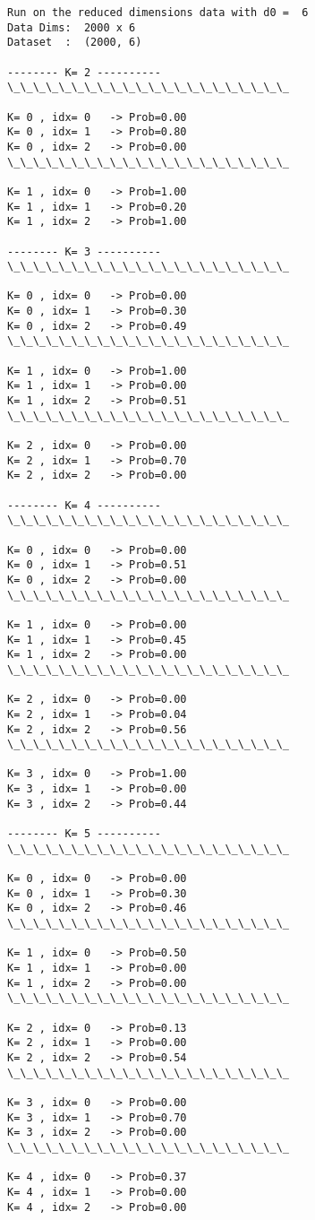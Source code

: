 \documentclass[11pt]{article}
\begin{document}
    \begin{Verbatim}[commandchars=\\\{\}]
Run on the reduced dimensions data with d0 =  6
Data Dims:  2000 x 6
Dataset  :  (2000, 6)

-------- K= 2 ----------
\_\_\_\_\_\_\_\_\_\_\_\_\_\_\_\_\_\_\_\_\_\_ 

K= 0 , idx= 0   -> Prob=0.00
K= 0 , idx= 1   -> Prob=0.80
K= 0 , idx= 2   -> Prob=0.00
\_\_\_\_\_\_\_\_\_\_\_\_\_\_\_\_\_\_\_\_\_\_ 

K= 1 , idx= 0   -> Prob=1.00
K= 1 , idx= 1   -> Prob=0.20
K= 1 , idx= 2   -> Prob=1.00

-------- K= 3 ----------
\_\_\_\_\_\_\_\_\_\_\_\_\_\_\_\_\_\_\_\_\_\_ 

K= 0 , idx= 0   -> Prob=0.00
K= 0 , idx= 1   -> Prob=0.30
K= 0 , idx= 2   -> Prob=0.49
\_\_\_\_\_\_\_\_\_\_\_\_\_\_\_\_\_\_\_\_\_\_ 

K= 1 , idx= 0   -> Prob=1.00
K= 1 , idx= 1   -> Prob=0.00
K= 1 , idx= 2   -> Prob=0.51
\_\_\_\_\_\_\_\_\_\_\_\_\_\_\_\_\_\_\_\_\_\_ 

K= 2 , idx= 0   -> Prob=0.00
K= 2 , idx= 1   -> Prob=0.70
K= 2 , idx= 2   -> Prob=0.00

-------- K= 4 ----------
\_\_\_\_\_\_\_\_\_\_\_\_\_\_\_\_\_\_\_\_\_\_ 

K= 0 , idx= 0   -> Prob=0.00
K= 0 , idx= 1   -> Prob=0.51
K= 0 , idx= 2   -> Prob=0.00
\_\_\_\_\_\_\_\_\_\_\_\_\_\_\_\_\_\_\_\_\_\_ 

K= 1 , idx= 0   -> Prob=0.00
K= 1 , idx= 1   -> Prob=0.45
K= 1 , idx= 2   -> Prob=0.00
\_\_\_\_\_\_\_\_\_\_\_\_\_\_\_\_\_\_\_\_\_\_ 

K= 2 , idx= 0   -> Prob=0.00
K= 2 , idx= 1   -> Prob=0.04
K= 2 , idx= 2   -> Prob=0.56
\_\_\_\_\_\_\_\_\_\_\_\_\_\_\_\_\_\_\_\_\_\_ 

K= 3 , idx= 0   -> Prob=1.00
K= 3 , idx= 1   -> Prob=0.00
K= 3 , idx= 2   -> Prob=0.44

-------- K= 5 ----------
\_\_\_\_\_\_\_\_\_\_\_\_\_\_\_\_\_\_\_\_\_\_ 

K= 0 , idx= 0   -> Prob=0.00
K= 0 , idx= 1   -> Prob=0.30
K= 0 , idx= 2   -> Prob=0.46
\_\_\_\_\_\_\_\_\_\_\_\_\_\_\_\_\_\_\_\_\_\_ 

K= 1 , idx= 0   -> Prob=0.50
K= 1 , idx= 1   -> Prob=0.00
K= 1 , idx= 2   -> Prob=0.00
\_\_\_\_\_\_\_\_\_\_\_\_\_\_\_\_\_\_\_\_\_\_ 

K= 2 , idx= 0   -> Prob=0.13
K= 2 , idx= 1   -> Prob=0.00
K= 2 , idx= 2   -> Prob=0.54
\_\_\_\_\_\_\_\_\_\_\_\_\_\_\_\_\_\_\_\_\_\_ 

K= 3 , idx= 0   -> Prob=0.00
K= 3 , idx= 1   -> Prob=0.70
K= 3 , idx= 2   -> Prob=0.00
\_\_\_\_\_\_\_\_\_\_\_\_\_\_\_\_\_\_\_\_\_\_ 

K= 4 , idx= 0   -> Prob=0.37
K= 4 , idx= 1   -> Prob=0.00
K= 4 , idx= 2   -> Prob=0.00

    \end{Verbatim}
\end{document}
